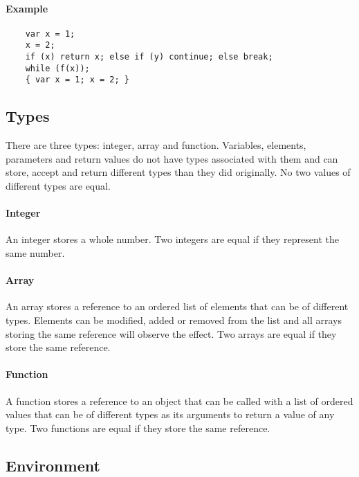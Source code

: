 \paragraph{Example}

\begin{verbatim}
    var x = 1;
    x = 2;
    if (x) return x; else if (y) continue; else break;
    while (f(x));
    { var x = 1; x = 2; }
\end{verbatim}

\subsection{Types}

There are three types: integer, array and function. Variables, elements, parameters and return values do not have types associated with them and can store, accept and return different types than they did originally. No two values of different types are equal.

\paragraph{Integer}

An integer stores a whole number. Two integers are equal if they represent the same number.

\paragraph{Array}

An array stores a reference to an ordered list of elements that can be of different types. Elements can be modified, added or removed from the list and all arrays storing the same reference will observe the effect. Two arrays are equal if they store the same reference.

\paragraph{Function}

A function stores a reference to an object that can be called with a list of ordered values that can be of different types as its arguments to return a value of any type. Two functions are equal if they store the same reference.

\subsection{Environment}


